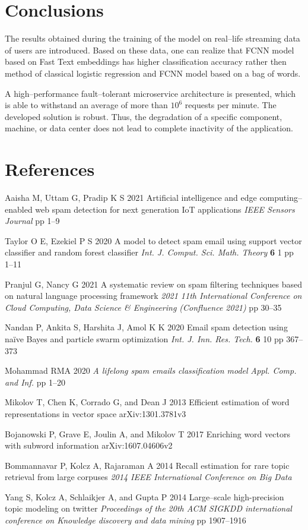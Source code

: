 \documentclass[12pt]{jpconf}
\begin{document}
\section{Conclusions}

The results obtained during the training of the model on real--life streaming data of users are introduced. Based on these data, one can realize that FCNN model based on Fast Text embeddings has higher classification accuracy rather then method of classical logistic regression and FCNN  model based on a bag of words.

A high--performance fault--tolerant microservice architecture is presented, which is able to withstand an average of more than $10^6$ requests per minute. The developed solution is robust. Thus, the degradation of a specific component, machine, or data center does not lead to complete inactivity of the application.

\section*{References}
\begin{thebibliography}{99}
Aaisha M, Uttam G, Pradip K S
2021 {Artificial intelligence and edge computing--enabled
	web spam detection for next generation IoT
	applications} {\it IEEE Sensors Journal} {\bf } pp 1--9

Taylor O E, Ezekiel P S
2020 {A model to detect spam email using support vector classifier and random forest classifier} 
\emph{Int. J. Comput. Sci. Math. Theory} {\bf 6} 1 pp 1--11

Pranjul G, Nancy G
2021 {A systematic review on spam filtering techniques based on
natural language processing framework} \emph{2021 11th International Conference on Cloud Computing, Data Science \& Engineering (Confluence 2021)} pp 30--35

Nandan P, Ankita S, Harshita J, Amol K K
2020 {Email spam detection using naïve Bayes and particle swarm optimization} \emph{Int. J. Inn. Res. Tech.} {\bf 6} 10 pp 367--373

Mohammad RMA
2020 \emph{A lifelong spam emails classification model}
\emph{Appl. Comp. and Inf.} pp 1--20

Mikolov T, Chen K, Corrado G, and Dean J
2013 {Efficient estimation of word representations in vector space} 
arXiv:1301.3781v3

Bojanowski P, Grave E, Joulin A, and Mikolov T
2017 {Enriching word vectors with subword information} 
arXiv:1607.04606v2

Bommannavar P, Kolcz A, Rajaraman A
2014 {Recall estimation for rare topic retrieval from large corpuses}
\emph{2014 IEEE International Conference on Big Data}

Yang S, Kolcz A, Schlaikjer A, and Gupta P
2014 {Large--scale high-precision topic modeling on twitter} 
\emph{Proceedings of the 20th ACM SIGKDD international conference on Knowledge discovery and data mining} pp 1907--1916

\end{thebibliography}
\end{document}
